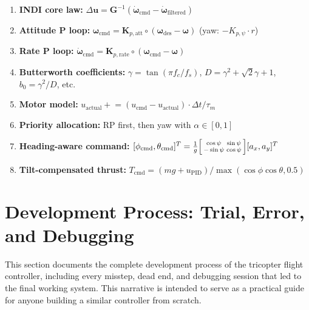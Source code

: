 \documentclass[12pt, a4paper]{article}
\newcommand{\bu}{\bm{u}}
\newcommand{\bomega}{\bm{\omega}}
\begin{document}
\begin{enumerate}
    \item \textbf{INDI core law:} $\Delta\bu = \bm{G}^{-1}(\dot{\bomega}_{\text{cmd}} - \dot{\bomega}_{\text{filtered}})$

    \item \textbf{Attitude P loop:} $\bomega_{\text{cmd}} = \bm{K}_{p,\text{att}} \circ (\bomega_{\text{des}} - \bomega)$ \; (yaw: $-K_{p,\psi} \cdot r$)

    \item \textbf{Rate P loop:} $\dot{\bomega}_{\text{cmd}} = \bm{K}_{p,\text{rate}} \circ (\bomega_{\text{cmd}} - \bomega)$

    \item \textbf{Butterworth coefficients:} $\gamma = \tan(\pi f_c / f_s)$, $D = \gamma^2 + \sqrt{2}\gamma + 1$, $b_0 = \gamma^2/D$, etc.

    \item \textbf{Motor model:} $u_{\text{actual}} \mathrel{+}= (u_{\text{cmd}} - u_{\text{actual}}) \cdot \Delta t / \tau_m$

    \item \textbf{Priority allocation:} RP first, then yaw with $\alpha \in [0, 1]$

    \item \textbf{Heading-aware command:} $[\phi_{\text{cmd}}, \theta_{\text{cmd}}]^T = \frac{1}{g} \begin{bsmallmatrix} \cos\psi & \sin\psi \\ -\sin\psi & \cos\psi \end{bsmallmatrix} [a_x, a_y]^T$

    \item \textbf{Tilt-compensated thrust:} $T_{\text{cmd}} = (mg + u_{\text{PID}}) / \max(\cos\phi\cos\theta, 0.5)$
\end{enumerate}

\section{Development Process: Trial, Error, and Debugging}
\label{sec:dev_process}

This section documents the complete development process of the tricopter flight controller, including every misstep, dead end, and debugging session that led to the final working system.  This narrative is intended to serve as a practical guide for anyone building a similar controller from scratch.
\end{document}
